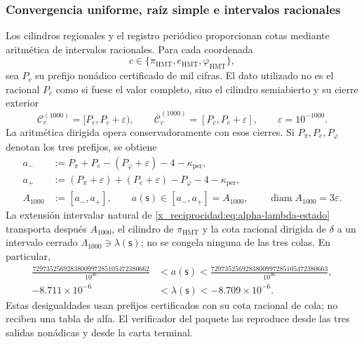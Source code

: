 \subsubsection{Convergencia uniforme, raíz simple e intervalos racionales}
\label{x_reciprocidad:subsec:alpha-cotas-completas-rev08}

Los cilindros regionales y el registro periódico proporcionan cotas mediante
aritmética de intervalos racionales. Para cada coordenada
\[
 c\in\{\pi_{\mathrm{HMT}},e_{\mathrm{HMT}},\varphi_{\mathrm{HMT}}\},
\]
sea \(P_c\) su prefijo nonádico certificado de mil cifras. El dato utilizado
no es el racional \(P_c\) como si fuese el valor completo, sino el cilindro
semiabierto y su cierre exterior
\[
 \mathcal C_c^{(1000)}=[P_c,P_c+\varepsilon),
 \qquad
 \overline{\mathcal C}_c^{(1000)}=[P_c,P_c+\varepsilon],
 \qquad \varepsilon=10^{-1000}.
\]
La aritmética dirigida opera conservadoramente con esos cierres. Si
\(P_\pi,P_e,P_\varphi\) denotan los tres prefijos, se obtiene
\begin{equation}
\begin{aligned}
 a_-&:=P_\pi+P_e-(P_\varphi+\varepsilon)-4-
       \kappa_{\mathrm{per}},\\
 a_+&:=(P_\pi+\varepsilon)+(P_e+\varepsilon)-P_\varphi-4-
       \kappa_{\mathrm{per}},\\
 A_{1000}&:=[a_-,a_+],
 \qquad a(\mathsf s)\in[a_-,a_+]=A_{1000},
 \qquad \operatorname{diam}A_{1000}=3\varepsilon.
\end{aligned}
\label{x_reciprocidad:eq:alpha-propagacion-colas-rev08}
\end{equation}
La extensión intervalar natural de
\eqref{x_reciprocidad:eq:alpha-lambda-estado} transporta después \(A_{1000}\), el cilindro
de \(\pi_{\mathrm{HMT}}\) y la cota racional dirigida de \(\delta\) a un
intervalo cerrado \(\Lambda_{1000}\ni\lambda(\mathsf s)\); no se congela
ninguna de las tres colas. En particular,
\begin{equation}
\begin{aligned}
 \frac{7297352569283800997285105472380662}{10^{36}}
 &<a(\mathsf s)<
 \frac{7297352569283800997285105472380663}{10^{36}},\\
 -8.711\mathbin{\times}10^{-6}
 &<\lambda(\mathsf s)<-8.709\mathbin{\times}10^{-6}.
\end{aligned}
 \label{x_reciprocidad:eq:alpha-cotas-precoordenada-lambda}
\end{equation}
Estas desigualdades usan prefijos certificados con su cota racional de
cola; no reciben una tabla de alfa. El verificador del paquete las reproduce
desde las tres salidas nonádicas y desde la carta terminal.

